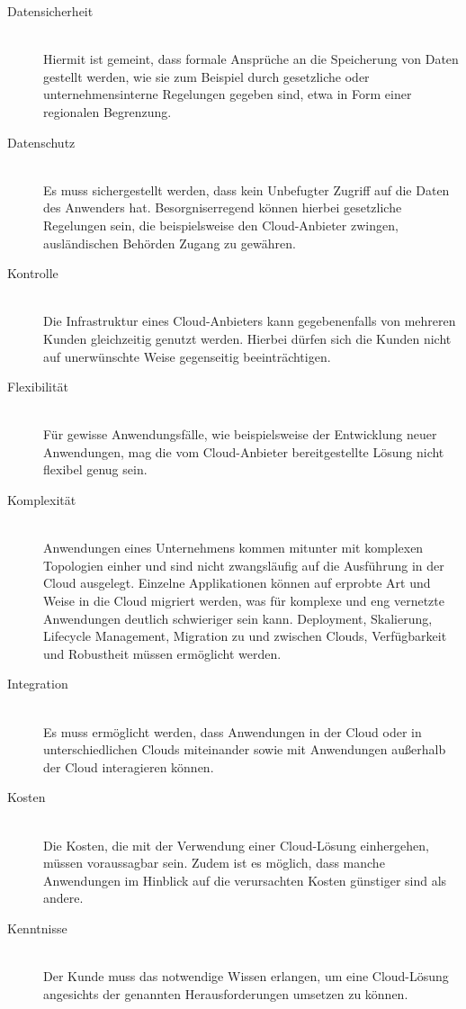 \begin{description}
  \item[Datensicherheit] \hfill \\
  Hiermit ist gemeint, dass formale Ansprüche an die Speicherung von Daten gestellt werden, wie sie zum Beispiel durch gesetzliche oder unternehmensinterne Regelungen gegeben sind, etwa in Form einer regionalen Begrenzung.
  \item[Datenschutz] \hfill \\
  Es muss sichergestellt werden, dass kein Unbefugter Zugriff auf die Daten des Anwenders hat. Besorgniserregend können hierbei gesetzliche Regelungen sein, die beispielsweise den Cloud-Anbieter zwingen, ausländischen Behörden Zugang zu gewähren.
  \item[Kontrolle] \hfill \\
  Die Infrastruktur eines Cloud-Anbieters kann gegebenenfalls von mehreren Kunden gleichzeitig genutzt werden. Hierbei dürfen sich die Kunden nicht auf unerwünschte Weise gegenseitig beeinträchtigen.
  \item[Flexibilität] \hfill \\
  Für gewisse Anwendungsfälle, wie beispielsweise der Entwicklung neuer Anwendungen, mag die vom Cloud-Anbieter bereitgestellte Lösung nicht flexibel genug sein.
  \item[Komplexität] \hfill \\
  Anwendungen eines Unternehmens kommen mitunter mit komplexen Topologien einher und sind nicht zwangsläufig auf die Ausführung in der Cloud ausgelegt. Einzelne Applikationen können auf erprobte Art und Weise in die Cloud migriert werden, was für komplexe und eng vernetzte Anwendungen deutlich schwieriger sein kann. Deployment, Skalierung, Lifecycle Management, Migration zu und zwischen Clouds, Verfügbarkeit und Robustheit müssen ermöglicht werden.
  \item[Integration] \hfill \\
  Es muss ermöglicht werden, dass Anwendungen in der Cloud oder in unterschiedlichen Clouds miteinander sowie mit Anwendungen außerhalb der Cloud interagieren können.
  \item[Kosten] \hfill \\
  Die Kosten, die mit der Verwendung einer Cloud-Lösung einhergehen, müssen voraussagbar sein. Zudem ist es möglich, dass manche Anwendungen im Hinblick auf die verursachten Kosten günstiger sind als andere.
  \item[Kenntnisse] \hfill \\
  Der Kunde muss das notwendige Wissen erlangen, um eine Cloud-Lösung angesichts der genannten Herausforderungen umsetzen zu können.
\end{description}


